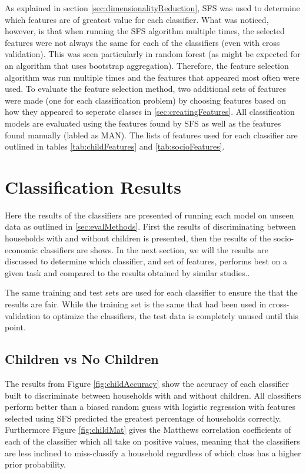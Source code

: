 As explained in section \ref{sec:dimensionalityReduction}, SFS was used to determine which features are of greatest value for each classifier. What was noticed, however, is that when running the SFS algorithm multiple times, the selected features were not always the same for each of the classifiers (even with cross validation). This was seen particularly in random forest (as might be expected for an algorithm that uses bootstrap aggregation).  Therefore, the feature selection algorithm was run multiple times and the features that appeared most often were used. To evaluate the feature selection method, two additional sets of features were made (one for each classification problem) by choosing features based on how they appeared to seperate classes in \ref{sec:creatingFeatures}. All classification models are evaluated using the features found by SFS as well as the features found manually (labled as MAN). The lists of features used for each classifier are outlined in tables \ref{tab:childFeatures} and \ref{tab:socioFeatures}. 

\childFeatures
\socioFeatures

\section{Classification Results}

Here the results of the classifiers are presented of running each model on unseen data as outlined in \ref{sec:evalMethods}. First the results of discriminating between households with and without children is presented, then the results of the socio-economic classifiers are shows. In the next section, we will the results are discussed to determine which classifier, and set of features, performs best on a given task and compared to the results obtained by similar studies..

The same training and test sets are used for each classifier to ensure the that the results are fair. While the training set is the same that had been used in cross-validation to optimize the classifiers, the test data is completely unused until this point.

\subsection{Children vs No Children}

\childAccuracy

The results from Figure \ref{fig:childAccuracy} show the accuracy of each classifier built to discriminate between households with and without children. All classifiers perform better than a biased random guess with logistic regression with features selected using SFS predicted the greatest percentage of households correctly. Furthermore Figure \ref{fig:childMat} gives the Matthews correlation coefficients of each of the classifier which all take on positive values, meaning that the classifiers are less inclined to miss-classify a household regardless of which class has a higher prior probability. 

